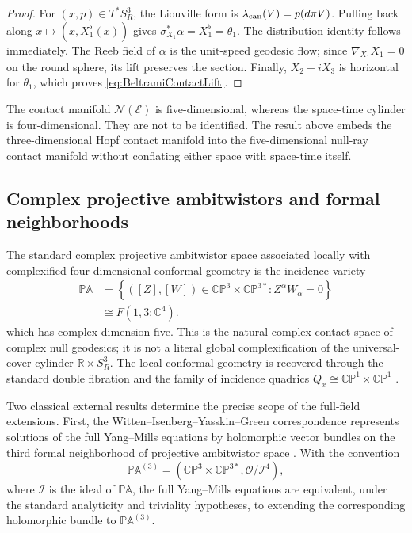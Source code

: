 \documentclass[aps,prd,reprint,nofootinbib,superscriptaddress]{revtex4-2}
\theoremstyle{definition}
\theoremstyle{remark}
\newcommand{\R}{\mathbb{R}}
\newcommand{\C}{\mathbb{C}}
\newcommand{\CP}{\mathbb{CP}}
\begin{document}
\begin{proof}
For $(x,p)\in T^*S^3_R$, the Liouville form is $\lambda_{\rm can}(V)=p(d\pi V)$.  Pulling back along $x\mapsto (x,X_1^\flat(x))$ gives $\sigma_{X_1}^*\alpha=X_1^\flat=\theta_1$.  The distribution identity follows immediately.  The Reeb field of $\alpha$ is the unit-speed geodesic flow; since $\nabla_{X_1}X_1=0$ on the round sphere, its lift preserves the section.  Finally, $X_2+iX_3$ is horizontal for $\theta_1$, which proves \eqref{eq:BeltramiContactLift}.
\end{proof}

The contact manifold $\mathcal N(\mathcal E)$ is five-dimensional, whereas the space-time cylinder is four-dimensional.  They are not to be identified.  The result above embeds the three-dimensional Hopf contact manifold into the five-dimensional null-ray contact manifold without conflating either space with space-time itself.

\subsection{Complex projective ambitwistors and formal neighborhoods}

The standard complex projective ambitwistor space associated locally with complexified four-dimensional conformal geometry is the incidence variety
\begin{align}
 \mathbb{PA}
 &=\left\{([Z],[W])\in\CP^3\times\CP^{3*}:Z^\alpha W_\alpha=0\right\}\nonumber\\
 &\cong F(1,3;\C^4).
 \label{eq:PAflag}
\end{align}
which has complex dimension five.  This is the natural complex contact space of complex null geodesics; it is not a literal global complexification of the universal-cover cylinder $\R\times S^3_R$.  The local conformal geometry is recovered through the standard double fibration and the family of incidence quadrics $Q_x\cong\CP^1\times\CP^1$ \cite{LeBrun1983,AtiyahDunajskiMason2017}.

Two classical external results determine the precise scope of the full-field extensions.  First, the Witten--Isenberg--Yasskin--Green correspondence represents solutions of the full Yang--Mills equations by holomorphic vector bundles on the third formal neighborhood of projective ambitwistor space \cite{Witten1978,IYG1978,WardWells1990}.  With the convention
\begin{equation}
 \mathbb{PA}^{(3)}
 =\left(\CP^3\times\CP^{3*},\mathcal O/\mathcal I^4\right),
 \label{eq:thirdformal}
\end{equation}
where $\mathcal I$ is the ideal of $\mathbb{PA}$, the full Yang--Mills equations are equivalent, under the standard analyticity and triviality hypotheses, to extending the corresponding holomorphic bundle to $\mathbb{PA}^{(3)}$.
\end{document}
